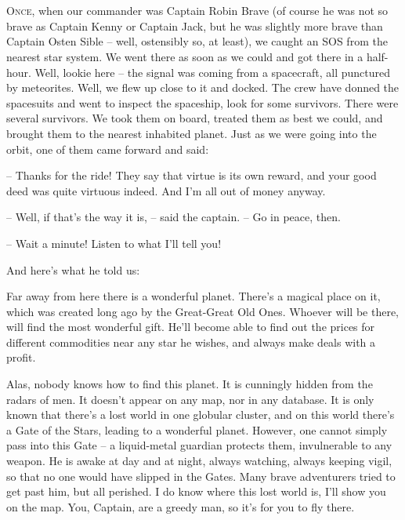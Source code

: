 \documentclass[ebook,twoside,final,openright]{memoir}
\begin{document}
\chapter{}
\par
\lettrine{O}{nce,} when our commander was Captain Robin Brave (of course he was not so brave as Captain Kenny or Captain Jack, but he was slightly more brave than Captain Osten Sible – well, ostensibly so, at least), we caught an SOS from the nearest star system. We went there as soon as we could and got there in a half-hour. Well, lookie here – the signal was coming from a spacecraft, all punctured by meteorites. Well, we flew up close to it and docked. The crew have donned the spacesuits and went to inspect the spaceship, look for some survivors. There were several survivors. We took them on board, treated them as best we could, and brought them to the nearest inhabited planet. Just as we were going into the orbit, one of them came forward and said: \par
\par
– Thanks for the ride! They say that virtue is its own reward, and your good deed was quite virtuous indeed. And I’m all out of money anyway.\par
– Well, if that’s the way it is, – said the captain. – Go in peace, then. \par
– Wait a minute! Listen to what I’ll tell you! \par
 And here’s what he told us:\par
\par
Far away from here there is a wonderful planet. There’s a magical place on it, which was created long ago by the Great-Great Old Ones. Whoever will be there, will find the most wonderful gift. He’ll become able to find out the prices for different commodities near any star he wishes, and always make deals with a profit. \par
Alas, nobody knows how to find this planet. It is cunningly hidden from the radars of men. It doesn’t appear on any map, nor in any database. It is only known that there’s a lost world in one globular cluster, and on this world there’s a Gate of the Stars, leading to a wonderful planet. However, one cannot simply pass into this Gate – a liquid-metal guardian protects them, invulnerable to any weapon. He is awake at day and at night, always watching, always keeping vigil, so that no one would have slipped in the Gates. Many brave adventurers tried to get past him, but all perished. I do know where this lost world is, I'll show you on the map. You, Captain, are a greedy man, so it’s for you to fly there.\par
\end{document}
